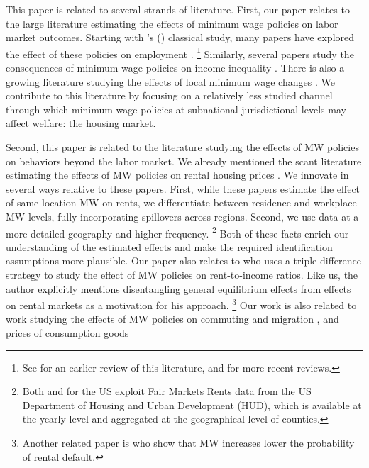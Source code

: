 This paper is related to several strands of literature.
First, our paper relates to the large literature estimating the effects of 
minimum wage policies on labor market outcomes.
Starting with \citeauthor{CardKrueger1994}'s (\citeyear{CardKrueger1994}) 
classical study, many papers have explored the effect of these policies on 
employment \parencite[some recent examples include][]{MeerWest2016,
CegnizEtAl2019}.%
\footnote{See \textcite{Neumark2006} for an earlier review of this literature, 
and \textcite{Dube2019, NeumarkShirley2021} for more recent reviews.}
Similarly, several papers study the consequences of minimum wage policies on 
income inequality \parencite{Lee1999, AutorEtAl2016}.
There is also a growing literature studying the effects of local minimum wage 
changes \parencite{DubeLindner2021}.
We contribute to this literature by focusing on a relatively less studied 
channel through which minimum wage policies at subnational jurisdictional 
levels may affect welfare: the housing market.

Second, this paper is related to the literature studying the effects of MW 
policies on behaviors beyond the labor market.
We already mentioned the scant literature estimating the effects of MW policies
on rental housing prices \parencite{Tidemann2018, Yamagishi2021}.
We innovate in several ways relative to these papers.
First, while these papers estimate the effect of same-location MW on rents, we 
differentiate between residence and workplace MW levels, fully incorporating
spillovers across regions.
Second, we use data at a more detailed geography and higher frequency.%
\footnote{Both \textcite{Tidemann2018} and \textcite{Yamagishi2019} for the US 
exploit Fair Markets Rents data from the US Department of Housing and Urban 
Development (HUD), which is available at the yearly level and aggregated at the 
geographical level of counties.}
Both of these facts enrich our understanding of the estimated effects and make 
the required identification assumptions more plausible.
Our paper also relates to \textcite{Hughes2020} who uses a triple difference 
strategy to study the effect of MW policies on rent-to-income ratios. Like us, 
the author explicitly mentions disentangling general equilibrium effects from 
effects on rental markets as a motivation for his approach.
\footnote{Another related paper is \textcite{AgarwalEtAl2019} who show that MW 
increases lower the probability of rental default.}
Our work is also related to work studying the effects of MW policies on 
commuting and migration \parencite{Cadena2014, Monras2019, PerezPerez2021}, and 
prices of consumption goods \parencite{AllegrettoReich2018, Leung2021}

